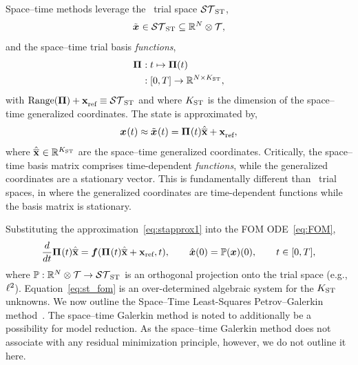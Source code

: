 \documentclass[3p,computermodern,10pt]{elsarticle}
\begin{document}
Space--time methods leverage the \spaceTimeAcronym\ trial space $\mathcal{ ST }_{\text{ST}}$,
\begin{equation}\label{eq:sttrialspace_def}
 \tilde{\boldsymbol x}^{} \in  \mathcal{ ST }_{\text{ST}} \subseteq \mathbb{R}^{N} \otimes \mathcal{T},
\end{equation}
and the space--time trial basis \textit{functions},
\begin{align*}
\stbasisArgnt{} &: t \mapsto \stbasis(t) \\
 &: [0,T] \rightarrow  \RR{N \times \stdim} ,%
\end{align*}
with $\text{Range}(\boldsymbol \Pi) + \mathbf{x}_\text{ref}^{} \equiv \mathcal{ ST }_{\text{ST}}$ and where $K_{\text{ST}}$ is the dimension of the space--time generalized coordinates.
The state is approximated by,
\begin{equation}\label{eq:stapprox1}
 {\boldsymbol x}^{}(t) \approx \tilde{\boldsymbol x}^{}(t)  = \boldsymbol \Pi^{}(t) \hat{\mathbf{\overline{x}}} + \mathbf{x}_\text{ref}^{},
\end{equation}
where $\hat{\mathbf{\overline{x}}}^{} \in \mathbb{R}^{K_{\text{ST}}}$ are the space--time generalized coordinates. Critically, the 
space--time basis matrix comprises time-dependent \textit{functions}, while the generalized coordinates are a stationary vector. This is fundamentally different than  
\spatialAcronym\ trial spaces, in where the generalized coordinates are time-dependent functions while the basis matrix is stationary.  

Substituting the approximation~\eqref{eq:stapprox1} into the FOM ODE~\eqref{eq:FOM},
\begin{equation}\label{eq:st_fom}
\frac{d }{dt} \boldsymbol \Pi^{}(t) \hat{\mathbf{\overline{x}}} =  \boldsymbol f(\boldsymbol \Pi^{}(t) \hat{\mathbf{\overline{x}}} + \mathbf{x}_\text{ref},t) , \qquad \hat{ \boldsymbol x}(0) =\mathbb{P}({\boldsymbol x})(0), \qquad t \in [0,T],
\end{equation}
where $\mathbb{P} : \mathbb{R}^{N} \otimes \mathcal{T} \rightarrow \mathcal{ ST }_{\text{ST}}$ is an orthogonal projection onto the trial space (e.g., $\ell^2$).
Equation~\eqref{eq:st_fom} is an over-determined algebraic system for the $K_{\text{ST}}$ unknowns. We now outline the Space--Time Least-Squares Petrov--Galerkin method~\cite{choi_stlspg}. 
The space--time Galerkin method is noted to additionally be a possibility for model reduction. As the space--time Galerkin method does not associate with any residual minimization 
principle, however, we do not outline it here.
\end{document}
